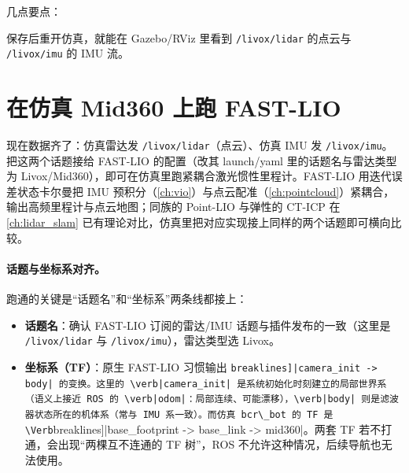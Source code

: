 几点要点：


保存后重开仿真，就能在 Gazebo/RViz 里看到 \verb|/livox/lidar| 的点云与 \verb|/livox/imu| 的 IMU 流。

\section{在仿真 Mid360 上跑 FAST-LIO}

现在数据齐了：仿真雷达发 \verb|/livox/lidar|（点云）、仿真 IMU 发 \verb|/livox/imu|。把这两个话题接给 FAST-LIO 的配置（改其 launch/yaml 里的话题名与雷达类型为 Livox/Mid360），即可在仿真里跑紧耦合激光惯性里程计。FAST-LIO 用迭代误差状态卡尔曼把 IMU 预积分（\cref{ch:vio}）与点云配准（\cref{ch:pointcloud}）紧耦合，输出高频里程计与点云地图\cite{xu2021fastlio}；同族的 Point-LIO\cite{he2023pointlio} 与弹性的 CT-ICP\cite{dellenbach2022cticp} 在 \cref{ch:lidar_slam} 已有理论对比，仿真里把对应实现接上同样的两个话题即可横向比较。

\paragraph{话题与坐标系对齐。}跑通的关键是“话题名”和“坐标系”两条线都接上：

\begin{itemize}
  \item \textbf{话题名}：确认 FAST-LIO 订阅的雷达/IMU 话题与插件发布的一致（这里是 \verb|/livox/lidar| 与 \verb|/livox/imu|），雷达类型选 Livox。
  \item \textbf{坐标系（TF）}：原生 FAST-LIO 习惯输出 \Verb[breaklines]|camera_init -> body| 的变换。这里的 \verb|camera_init| 是系统初始化时刻建立的局部世界系（语义上接近 ROS 的 \verb|odom|：局部连续、可能漂移），\verb|body| 则是滤波器状态所在的机体系（常与 IMU 系一致）。而仿真 bcr\_bot 的 TF 是 \Verb[breaklines]|base_footprint -> base_link -> mid360|。两套 TF 若不打通，会出现“两棵互不连通的 TF 树”，ROS 不允许这种情况，后续导航也无法使用。
\end{itemize}

